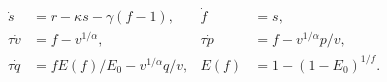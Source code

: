 \documentclass[12pt]{article}
\begin{document}
\fontsize{23}{29}\selectfont\[
\begin{aligned}\dot s&=r-\kappa s-\gamma(f-1),&\dot f&=s,\\\tau\dot v&=f-v^{1/\alpha},&\tau\dot p&=f-v^{1/\alpha}p/v,\\\tau\dot q&=fE(f)/E_0-v^{1/\alpha}q/v,&E(f)&=1-(1-E_0)^{1/f}.\end{aligned}
\]
\end{document}
